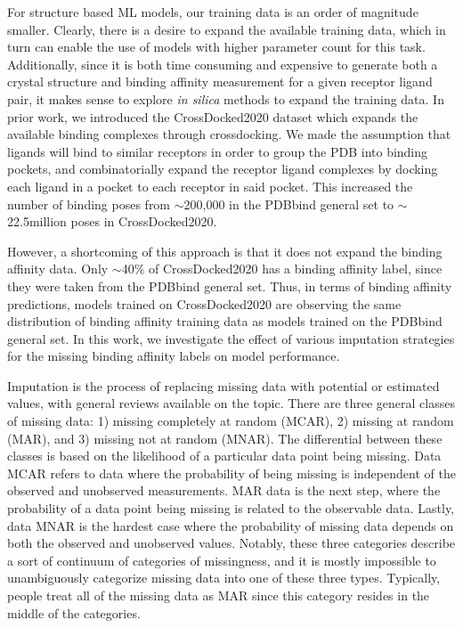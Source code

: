 \documentclass[journal=jmcmar,manuscript=article]{achemso}
\begin{document}
For structure based ML models, our training data is an order of magnitude smaller.
Clearly, there is a desire to expand the available training data, which in turn can enable the use of models with higher parameter count for this task.
Additionally, since it is both time consuming and expensive to generate both a crystal structure and binding affinity measurement for a given receptor ligand pair, it makes sense to explore \textit{in silica} methods to expand the training data.
In prior work, we introduced the CrossDocked2020 dataset which expands the available binding complexes through crossdocking\cite{crossdocked2020}.
We made the assumption that ligands will bind to similar receptors in order to group the PDB into binding pockets, and combinatorially expand the receptor ligand complexes by docking each ligand in a pocket to each receptor in said pocket.
This increased the number of binding poses from $\sim$200,000 in the PDBbind general set to $\sim$22.5million poses in CrossDocked2020\cite{crossdocked2020}.

However, a shortcoming of this approach is that it does not expand the binding affinity data.
Only $\sim$40\% of CrossDocked2020 has a binding affinity label, since they were taken from the PDBbind general set.
Thus, in terms of binding affinity predictions, models trained on CrossDocked2020 are observing the same distribution of binding affinity training data as models trained on the PDBbind general set.
In this work, we investigate the effect of various imputation strategies for the missing binding affinity labels on model performance.

Imputation is the process of replacing missing data with potential or estimated values, with general reviews available on the topic.\cite{surveyReview1, review2}%
There are three general classes of missing data: 1) missing completely at random (MCAR), 2) missing at random (MAR), and 3) missing not at random (MNAR).
The differential between these classes is based on the likelihood of a particular data point being missing.
Data MCAR refers to data where the probability of being missing is independent of the observed and unobserved measurements.
MAR data is the next step, where the probability of a data point being missing is related to the observable data.
Lastly, data MNAR is the hardest case where the probability of missing data depends on both the observed and unobserved values.
Notably, these three categories describe a sort of continuum of categories of missingness, and it is mostly impossible to unambiguously categorize missing data into one of these three types.
Typically, people treat all of the missing data as MAR since this category resides in the middle of the categories.
\end{document}
